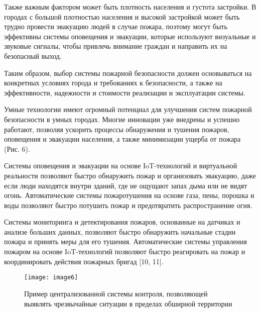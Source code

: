 \begin{multicols}{2}
Также важным фактором может быть плотность населения и густота
застройки. В городах с большой плотностью населения и высокой застройкой
может быть трудно провести эвакуацию людей в случае пожара, поэтому
могут быть эффективны системы оповещения и эвакуации, которые используют
визуальные и звуковые сигналы, чтобы привлечь внимание граждан и
направить их на безопасный выход.

Таким образом, выбор системы пожарной безопасности должен основываться
на конкретных условиях города и требованиях к безопасности, а также на
эффективности, надежности и стоимости реализации и эксплуатации системы.

Умные технологии имеют огромный потенциал для улучшения систем пожарной
безопасности в умных городах. Многие инновации уже внедрены и успешно
работают, позволяя ускорить процессы обнаружения и тушения пожаров,
оповещения и эвакуации населения, а также минимизации ущерба от пожара
(Рис. 6).

Системы оповещения и эвакуации на основе IoT-технологий и виртуальной
реальности позволяют быстро обнаружить пожар и организовать эвакуацию,
даже если люди находятся внутри зданий, где не ощущают запах дыма или не
видят огонь. Автоматические системы пожаротушения на основе газа, пены,
порошка и воды позволяют быстро потушить пожар и предотвратить
распространение огня.

Системы мониторинга и детектирования пожаров, основанные на датчиках и
анализе больших данных, позволяют быстро обнаружить начальные стадии
пожара и принять меры для его тушения. Автоматические системы управления
пожаром на основе IoT-технологий позволяют быстро реагировать на пожар и
координировать действия пожарных бригад {[}10, 11{]}.

\end{multicols}

\begin{figure}[H]
  \centering
  \texttt{[image: image6]}
  \caption{Пример централизованной системы контроля, позволяющей выявлять
чрезвычайные ситуации в пределах обширной территории}
\end{figure}

